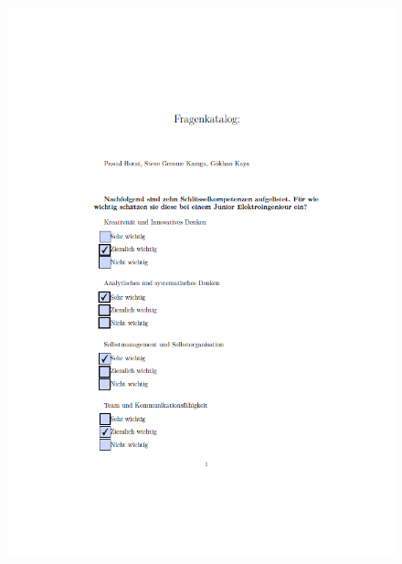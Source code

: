 \begin{figure}[ht]
 	\centering
 	\includegraphics[width=1.3\textwidth]{images/Imper1.png}
 	\label{fig:fragimp1}
\end{figure}

